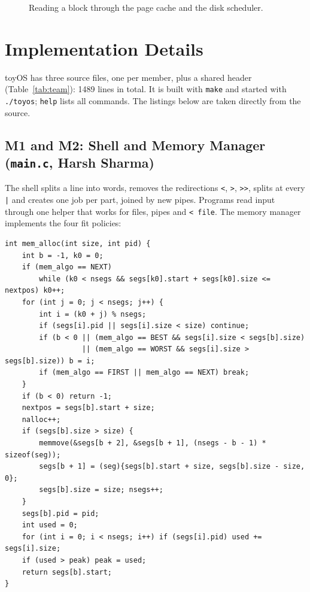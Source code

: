 \documentclass[12pt,a4paper]{article}
\begin{document}
\begin{figure}[H]
\centering

\caption{Reading a block through the page cache and the disk scheduler.}
\label{fig:cacheflow}
\end{figure}

\section{Implementation Details}

toyOS has three source files, one per member, plus a shared header (Table~\ref{tab:team}): 1489 lines in total. It is built with \texttt{make} and started with \texttt{./toyos}; \texttt{help} lists all commands. The listings below are taken directly from the source.

\subsection{M1 and M2: Shell and Memory Manager (\texttt{main.c}, Harsh Sharma)}

The shell splits a line into words, removes the redirections \texttt{<}, \texttt{>}, \texttt{>>}, splits at every \texttt{|} and creates one job per part, joined by new pipes. Programs read input through one helper that works for files, pipes and \texttt{< file}. The memory manager implements the four fit policies:

\noindent\begin{minipage}{\linewidth}
\begin{lstlisting}[firstnumber=389, caption={First, next, best and worst fit (\texttt{main.c})}]
int mem_alloc(int size, int pid) {
    int b = -1, k0 = 0;
    if (mem_algo == NEXT)
        while (k0 < nsegs && segs[k0].start + segs[k0].size <= nextpos) k0++;
    for (int j = 0; j < nsegs; j++) {
        int i = (k0 + j) % nsegs;
        if (segs[i].pid || segs[i].size < size) continue;
        if (b < 0 || (mem_algo == BEST && segs[i].size < segs[b].size)
                  || (mem_algo == WORST && segs[i].size > segs[b].size)) b = i;
        if (mem_algo == FIRST || mem_algo == NEXT) break;
    }
    if (b < 0) return -1;
    nextpos = segs[b].start + size;
    nalloc++;
    if (segs[b].size > size) {
        memmove(&segs[b + 2], &segs[b + 1], (nsegs - b - 1) * sizeof(seg));
        segs[b + 1] = (seg){segs[b].start + size, segs[b].size - size, 0};
        segs[b].size = size; nsegs++;
    }
    segs[b].pid = pid;
    int used = 0;
    for (int i = 0; i < nsegs; i++) if (segs[i].pid) used += segs[i].size;
    if (used > peak) peak = used;
    return segs[b].start;
}
\end{lstlisting}
\end{minipage}
\end{document}
